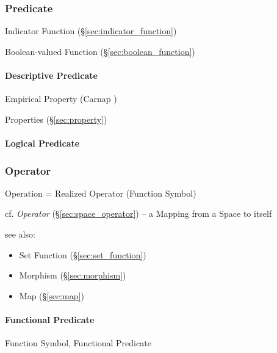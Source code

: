 \subsubsection{Predicate}\label{sec:predicate}

Indicator Function (\S\ref{sec:indicator_function})

Boolean-valued Function (\S\ref{sec:boolean_function})



\paragraph{Descriptive Predicate}\label{sec:descriptive_predicate}\hfill

Empirical Property (Carnap \cite{carnap59})

Properties (\S\ref{sec:property})



\paragraph{Logical Predicate}\label{sec:logical_predicate}\hfill



\subsubsection{Operator}\label{sec:operator}

Operation = Realized Operator (Function Symbol)

\fist cf. \emph{Operator} (\S\ref{sec:space_operator}) -- a Mapping from a Space
to itself

see also:
\begin{itemize}
\item Set Function (\S\ref{sec:set_function})
\item Morphism (\S\ref{sec:morphism})
\item Map (\S\ref{sec:map})
\end{itemize}



\paragraph{Functional Predicate}\label{sec:functional_predicate}\hfill

Function Symbol, Functional Predicate



